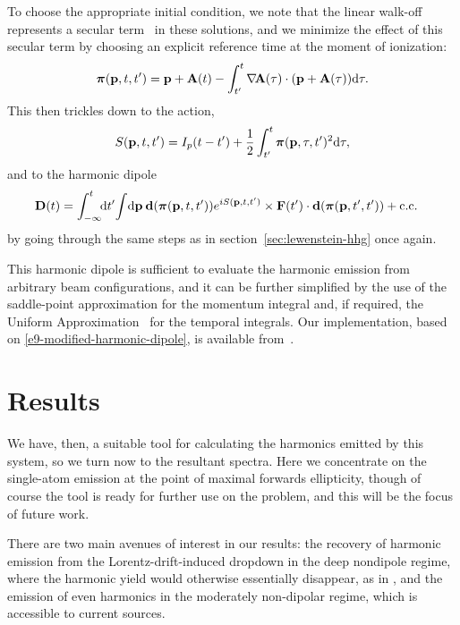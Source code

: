 To choose the appropriate initial condition, we note that the linear walk-off represents a secular term~\cite{Nayfeh_secular_terms} in these solutions, and we minimize the effect of this secular term by choosing an explicit reference time at the moment of ionization:
\begin{equation}
\boldsymbol{\pi}(\vb{p},t,t')=\vb{p}+\vb{A}(t)-\int_{t'}^t \nabla\!\vb{A}(\tau) \cdot (\vb{p}+\vb{A}(\tau))\mathrm{d}\tau.
\label{e9-modified-kinematic-momentum-nondipole}
\end{equation}
This then trickles down to the action,
\begin{equation}
S(\vb{p},t,t')=I_p(t-t')+\frac12 \int_{t'}^t \boldsymbol{\pi}(\vb{p},\tau,t')^2\mathrm{d}\tau,
\label{e9-modified-action}
\end{equation}
and to the harmonic dipole
\begin{align}
\vb D(t)
=
\int_{-\infty}^t \!\!\mathrm{d} t'\!
\int\!\mathrm{d}\vb{p}\:
&
\vb{d}(\boldsymbol{\pi}(\vb{p},t,t'))
e^{iS(\vb{p},t,t')}
\times\vb{F}(t')\cdot\vb{d}(\boldsymbol{\pi}(\vb{p},t',t'))
+\mathrm{c.c.}
\label{e9-modified-harmonic-dipole}
\end{align}
by going through the same steps as in section~\ref{sec:lewenstein-hhg} once again.
 
This harmonic dipole is sufficient to evaluate the harmonic emission from arbitrary beam configurations, and it can be further simplified by the use of the saddle-point approximation for the momentum integral and, if required, the Uniform Approximation~\cite{figueira_uniform-approximation_2002, milosevic_long-quantum-orbits_2002} for the temporal integrals. Our implementation, based on \eqref{e9-modified-harmonic-dipole}, is available from~.









\section{Results}

We have, then, a suitable tool for calculating the harmonics emitted by this system, so we turn now to the resultant spectra. Here we concentrate on the single-atom emission at the point of maximal forwards ellipticity, though of course the tool is ready for further use on the problem, and this will be the focus of future work.




There are two main avenues of interest in our results: the recovery of harmonic emission from the Lorentz-drift-induced dropdown in the deep nondipole regime, where the harmonic yield would otherwise essentially disappear, as in , and the emission of even harmonics in the moderately non-dipolar regime, which is accessible to current sources.



